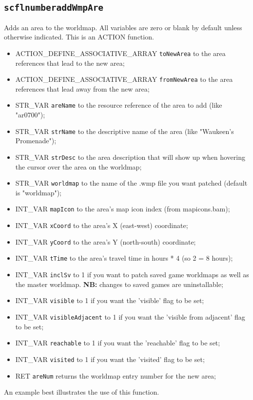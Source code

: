 \documentclass{article}
\def\DEFINE#1{{\tt \bf #1}\label{#1}\index{#1}}
\begin{document}
\subsection{\DEFINE{scflnumberaddWmpAre}}
Adds an area to the worldmap. All variables are zero or blank by default unless otherwise indicated.
This is an ACTION function.

\begin{itemize}
\item ACTION_DEFINE_ASSOCIATIVE_ARRAY \verb+toNewArea+ to the area references that lead to the new area;
\item ACTION_DEFINE_ASSOCIATIVE_ARRAY \verb+fromNewArea+ to the area references that lead away from the new area;
\item STR_VAR \verb+areName+ to the resource reference of the area to add (like "ar0700");
\item STR_VAR \verb+strName+ to the descriptive name of the area (like "Waukeen's Promenade");
\item STR_VAR \verb+strDesc+ to the area description that will show up when hovering the cursor over the area on the worldmap;
\item STR_VAR \verb+worldmap+ to the name of the .wmp file you want patched (default is "worldmap");
\item INT_VAR \verb+mapIcon+ to the area's map icon index (from mapicons.bam);
\item INT_VAR \verb+xCoord+ to the area's X (east-west) coordinate;
\item INT_VAR \verb+yCoord+ to the area's Y (north-south) coordinate;
\item INT_VAR \verb+tTime+ to the area's travel time in hours * 4 (so 2 = 8 hours);
\item INT_VAR \verb+inclSv+ to 1 if you want to patch saved game worldmaps as well as the master worldmap. \textbf{NB:} changes to saved games are uninstallable;
\item INT_VAR \verb+visible+ to 1 if you want the 'visible' flag to be set;
\item INT_VAR \verb+visibleAdjacent+ to 1 if you want the 'visible from adjacent' flag to be set;
\item INT_VAR \verb+reachable+ to 1 if you want the 'reachable' flag to be set;
\item INT_VAR \verb+visited+ to 1 if you want the 'visited' flag to be set;
\item RET \verb+areNum+ returns the worldmap entry number for the new area;
\end{itemize}
An example best illustrates the use of this function.
\end{document}
